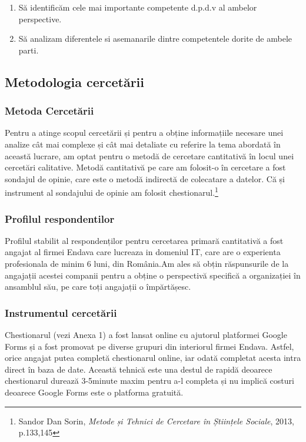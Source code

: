 \documentclass[a4paper, 12pt]{article}
\begin{document}
	\begin{enumerate}[(1)]
		\item Să identificăm cele mai importante competente d.p.d.v al ambelor perspective.

		\item Să analizam diferentele si asemanarile dintre competentele dorite de ambele parti.

	\end{enumerate}

	\subsection{Metodologia cercetării}

		\subsubsection{Metoda Cercetării}
	\qquad\space Pentru a atinge scopul cercetării și pentru a obține informațiile necesare unei analize cât mai complexe și cât mai detaliate cu referire la tema abordată în această lucrare, am optat pentru o metodă de cercetare cantitativă în locul unei cercetări calitative.
	\quad Metodă cantitativă pe care am folosit-o în cercetare a fost sondajul de opinie, care este o metodă indirectă de colecatare a datelor. Că și instrument al sondajului de opinie am folosit chestionarul.\footnote{Sandor Dan Sorin, \textit{Metode și Tehnici de Cercetare în Științele Sociale}, 2013, p.133,145}

		\subsubsection{Profilul respondentilor}
	\quad Profilul stabilit al respondenților pentru cercetarea primară cantitativă a fost angajat al firmei Endava care lucreaza in domeniul IT, care are  o experienta profesionala de minim 6 luni, din România.Am ales să obțin răspunsurile de la angajații acestei companii pentru a obține o perspectivă specifică a organizației în ansamblul său, pe care toți angajații o împărtășesc.
		
	\subsubsection{Instrumentul cercetării}

	\quad Chestionarul (vezi Anexa 1) a fost lansat online cu ajutorul platformei Google Forms și a fost promovat  pe diverse grupuri din interiorul firmei Endava. Astfel, orice angajat putea completă chestionarul online, iar odată completat acesta intra direct în baza de date. Această tehnică este una destul de rapidă deoarece chestionarul durează 3-5minute maxim pentru a-l completa și nu implică costuri deoarece Google Forms este o platforma gratuită.
\end{document}
